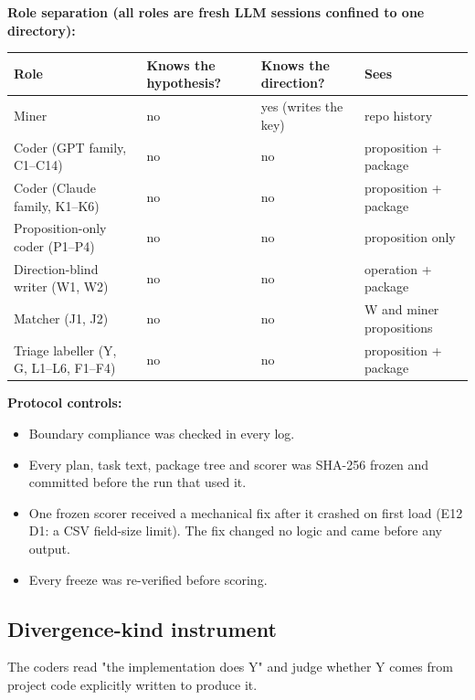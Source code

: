 \documentclass[acmsmall,screen,review,anonymous]{acmart}
\begin{document}
\textbf{Role separation (all roles are fresh LLM sessions confined to one directory):}
\begin{table}[t]
\small
\begin{tabularx}{\linewidth}{lXXX}
\toprule
Role & Knows the hypothesis? & Knows the direction? & Sees \\
\midrule
Miner & no & yes (writes the key) & repo history \\
Coder (GPT family, C1--C14) & no & no & proposition + package \\
Coder (Claude family, K1--K6) & no & no & proposition + package \\
Proposition-only coder (P1--P4) & no & no & proposition only \\
Direction-blind writer (W1, W2) & no & no & operation + package \\
Matcher (J1, J2) & no & no & W and miner propositions \\
Triage labeller (Y, G, L1--L6, F1--F4) & no & no & proposition + package \\
\bottomrule
\end{tabularx}
\end{table}

\textbf{Protocol controls:}
\begin{itemize}
\item Boundary compliance was checked in every log.
\item Every plan, task text, package tree and scorer was SHA-256 frozen and committed before the run that used it.
\item One frozen scorer received a mechanical fix after it crashed on first load (E12 D1: a CSV field-size limit). The fix changed no logic and came before any output.
\item Every freeze was re-verified before scoring.
\end{itemize}

\subsection{Divergence-kind instrument}
The coders read "the implementation does Y" and judge whether Y comes from project code explicitly written to produce it.
\end{document}
